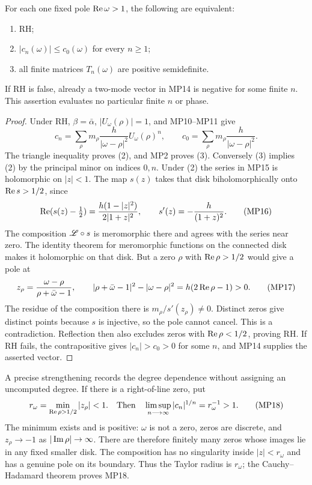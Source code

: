 \begin{swpoletheorem}
For each one fixed pole $\operatorname{Re}\omega>1$, the following are equivalent:
\begin{enumerate}
\item RH;
\item $|c_n(\omega)|\leq c_0(\omega)$ for every $n\geq1$;
\item all finite matrices $T_n(\omega)$ are positive semidefinite.
\end{enumerate}
If RH is false, already a two-mode vector in MP14 is negative for some
finite $n$. This assertion evaluates no particular finite $n$ or phase.
\end{swpoletheorem}
\begin{proof}
Under RH, $\beta=\bar\alpha$, $|U_\omega(\rho)|=1$, and
MP10--MP11 give
\[
 c_n=\sum_\rho m_\rho\frac h{|\omega-\rho|^2}
                                      U_\omega(\rho)^n,
 \qquad c_0=\sum_\rho m_\rho\frac h{|\omega-\rho|^2}.
\]
The triangle inequality proves (2), and MP2 proves (3).
Conversely (3) implies (2) by the principal minor on indices $0,n$.
Under (2) the series in MP15 is holomorphic on $|z|<1$.
The map $s(z)$ takes that disk biholomorphically onto $\operatorname{Re} s>1/2$,
since
\begin{equation}
 \operatorname{Re}(s(z)-\tfrac12)=\frac{h(1-|z|^2)}{2|1+z|^2},\qquad
 s'(z)=-\frac h{(1+z)^2}.\tag{MP16}
\end{equation}
The composition $\mathscr L\circ s$ is meromorphic there and agrees with the
series near zero. The identity theorem for meromorphic functions on the
connected disk makes it holomorphic on that disk. But a zero $\rho$ with
$\operatorname{Re}\rho>1/2$ would give a pole at
\begin{equation}
 z_\rho=\frac{\omega-\rho}{\rho+\bar\omega-1},\qquad
 |\rho+\bar\omega-1|^2-|\omega-\rho|^2
                       =h(2\operatorname{Re}\rho-1)>0.\tag{MP17}
\end{equation}
The residue of the composition there is
$m_\rho/s'(z_\rho)\ne0$. Distinct zeros give distinct points because
$s$ is injective, so the pole cannot cancel. This is a contradiction.
Reflection then also excludes zeros with $\operatorname{Re}\rho<1/2$, proving RH.
If RH fails, the contrapositive gives $|c_n|>c_0>0$ for some $n$,
and MP14 supplies the asserted vector.
\end{proof}

A precise strengthening records the degree dependence without assigning
an uncomputed degree. If there is a right-of-line zero, put
\begin{equation}
 r_\omega=\min_{\operatorname{Re}\rho>1/2}|z_\rho|<1.
 \quad\text{Then}\quad
 \limsup_{n\longrightarrow\infty}|c_n|^{1/n}=r_\omega^{-1}>1.
 \tag{MP18}
\end{equation}
The minimum exists and is positive: $\omega$ is not a zero, zeros are
discrete, and $z_\rho\to-1$ as $|\operatorname{Im}\rho|\to\infty$. There are
therefore finitely many zeros whose images lie in any fixed smaller disk.
The composition has no singularity inside $|z|<r_\omega$ and has a
genuine pole on its boundary. Thus the Taylor radius is $r_\omega$;
the Cauchy--Hadamard theorem proves MP18.

